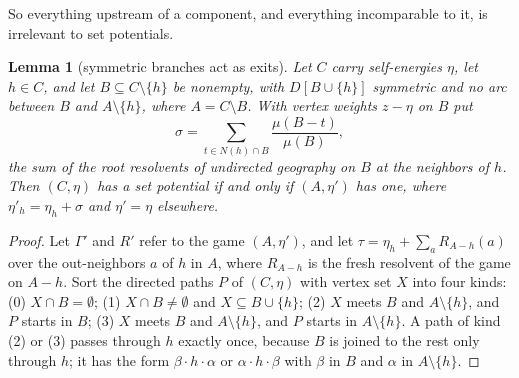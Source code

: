 \documentclass[11pt]{amsart}
\theoremstyle{plain}
\newtheorem{lemma}[theorem]{Lemma}
\theoremstyle{definition}
\theoremstyle{remark}
\numberwithin{equation}{section}
\begin{document}
So everything upstream of a component, and everything incomparable to it, is irrelevant to set potentials.

\begin{lemma}[symmetric branches act as exits]\label{lem:branches}
Let $C$ carry self-energies $\eta$, let $h\in C$, and let $B\subseteq C\setminus\{h\}$ be nonempty, with $D[B\cup\{h\}]$ symmetric and no arc between $B$ and $A\setminus\{h\}$, where $A=C\setminus B$. With vertex weights $z-\eta$ on $B$ put
\[
\sigma=\sum_{t\in N(h)\cap B}\frac{\mu(B-t)}{\mu(B)},
\]
the sum of the root resolvents of undirected geography on $B$ at the neighbors of $h$. Then $(C,\eta)$ has a set potential if and only if $(A,\eta')$ has one, where $\eta'_h=\eta_h+\sigma$ and $\eta'=\eta$ elsewhere.
\end{lemma}
\begin{proof}
Let $\Gamma'$ and $R'$ refer to the game $(A,\eta')$, and let $\tau=\eta_h+\sum_aR_{A-h}(a)$ over the out-neighbors $a$ of $h$ in $A$, where $R_{A-h}$ is the fresh resolvent of the game on $A-h$. Sort the directed paths $P$ of $(C,\eta)$ with vertex set $X$ into four kinds: (0) $X\cap B=\emptyset$; (1) $X\cap B\neq\emptyset$ and $X\subseteq B\cup\{h\}$; (2) $X$ meets $B$ and $A\setminus\{h\}$, and $P$ starts in $B$; (3) $X$ meets $B$ and $A\setminus\{h\}$, and $P$ starts in $A\setminus\{h\}$. A path of kind (2) or (3) passes through $h$ exactly once, because $B$ is joined to the rest only through $h$; it has the form $\beta\cdot h\cdot\alpha$ or $\alpha\cdot h\cdot\beta$ with $\beta$ in $B$ and $\alpha$ in $A\setminus\{h\}$.


\end{proof}
\end{document}
